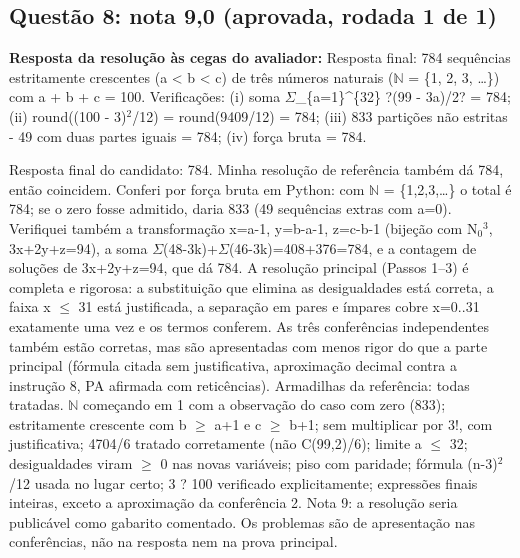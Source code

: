 \documentclass{article}%
\begin{document}
\subsection*{Questão 8: nota 9,0 (aprovada, rodada 1 de 1)}%
\textbf{Resposta da resolução às cegas do avaliador:} Resposta final: 784 sequências estritamente crescentes (a < b < c) de três números naturais ($\mathbb{N}$ = \{1, 2, 3, \ldots{}\}) com a + b + c = 100.\newline%
\newline%
Verificações: (i) soma $\Sigma$\_\{a=1\}\^{}\{32\} ?(99 - 3a)/2? = 784; (ii) round((100 - 3)$^2$/12) = round(9409/12) = 784; (iii) 833 partições não estritas - 49 com duas partes iguais = 784; (iv) força bruta = 784.\par %
Resposta final do candidato: 784. Minha resolução de referência também dá 784, então coincidem. Conferi por força bruta em Python: com $\mathbb{N}$ = \{1,2,3,\ldots{}\} o total é 784; se o zero fosse admitido, daria 833 (49 sequências extras com a=0). Verifiquei também a transformação x=a-1, y=b-a-1, z=c-b-1 (bijeção com N$_{0}$$^3$, 3x+2y+z=94), a soma $\Sigma$(48-3k)+$\Sigma$(46-3k)=408+376=784, e a contagem de soluções de 3x+2y+z=94, que dá 784.\newline%
\newline%
A resolução principal (Passos 1--3) é completa e rigorosa: a substituição que elimina as desigualdades está correta, a faixa x $\leq$ 31 está justificada, a separação em pares e ímpares cobre x=0..31 exatamente uma vez e os termos conferem. As três conferências independentes também estão corretas, mas são apresentadas com menos rigor do que a parte principal (fórmula citada sem justificativa, aproximação decimal contra a instrução 8, PA afirmada com reticências).\newline%
\newline%
Armadilhas da referência: todas tratadas. $\mathbb{N}$ começando em 1 com a observação do caso com zero (833); estritamente crescente com b $\geq$ a+1 e c $\geq$ b+1; sem multiplicar por 3!, com justificativa; 4704/6 tratado corretamente (não C(99,2)/6); limite a $\leq$ 32; desigualdades viram $\geq$ 0 nas novas variáveis; piso com paridade; fórmula (n-3)$^2$/12 usada no lugar certo; 3 ? 100 verificado explicitamente; expressões finais inteiras, exceto a aproximação da conferência 2.\newline%
\newline%
Nota 9: a resolução seria publicável como gabarito comentado. Os problemas são de apresentação nas conferências, não na resposta nem na prova principal.%
$$
\end{document}
